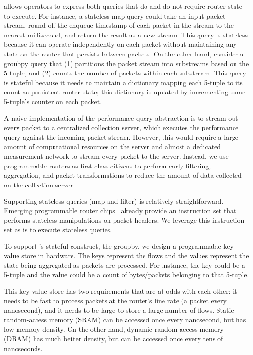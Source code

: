 \TheSystem allows operators to express both queries that do and do not require
router state to execute. For instance, a stateless {\ct map} query could take
an input packet stream, round off the enqueue timestamp of each packet in the
stream to the nearest millisecond, and return the result as a new stream.  This
query is stateless because it can operate independently on each packet without
maintaining any state on the router that persists between packets. On the other
hand, consider a {\ct groubpy} query that (1) partitions the packet stream into
substreams based on the 5-tuple, and (2) counts the number of packets within
each substream. This query is stateful because it needs to maintain a
dictionary mapping each 5-tuple to its count as persistent router state; this
dictionary is updated by incrementing some 5-tuple's counter on each packet.


A naive implementation of the performance query abstraction is to stream out
every packet to a centralized collection server, which executes the performance
query against the incoming packet stream. However, this would require a large
amount of computational resources on the server and almost a dedicated
measurement network to stream every packet to the server. Instead, we use
programmable routers as first-class citizens to perform early filtering,
aggregation, and packet transformations to reduce the amount of data collected
on the collection server.

Supporting stateless queries ({\ct map} and {\ct filter}) is relatively
straightforward. Emerging programmable router chips~\cite{rmt, xpliant,
flexpipe, tofino} already provide an instruction set that performs stateless
manipulations on packet headers. We leverage this instruction set as is to
execute stateless queries.

To support \TheSystem's stateful construct, the {\ct groupby}, we design a
programmable key-value store in hardware. The keys represent the flows and the
values represent the state being aggregated as packets are processed. For
instance, the key could be a 5-tuple and the value could be a count of
bytes/packets belonging to that 5-tuple.

This key-value store has two requirements that are at odds with each other: it
needs to be fast to process packets at the router's line rate (a packet every
nanosecond), and it needs to be large to store a large number of flows. Static
random-access memory (SRAM) can be accessed once every nanosecond, but has low
memory density. On the other hand, dynamic random-access memory (DRAM) has much
better density, but can be accessed once every tens of nanoseconds.

